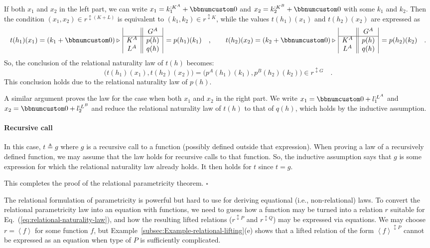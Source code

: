 If both $x_{1}$ and $x_{2}$ in the left part, we can write $x_{1}=k_{1}^{:K^{A}}+\bbnum 0$
and $x_{2}=k_{2}^{:K^{B}}+\bbnum 0$ with some $k_{1}$ and $k_{2}$.
Then the condition $(x_{1},x_{2})\in r^{\updownarrow(K+L)}$ is equivalent
to $(k_{1},k_{2})\in r^{\updownarrow K}$, while the values $t(h_{1})(x_{1})$
and $t(h_{2})(x_{2})$ are expressed as
\[
t(h_{1})(x_{1})=(k_{1}+\bbnum 0)\triangleright\,\begin{array}{|c||c|}
 & G^{A}\\
\hline K^{A} & p(h)\\
L^{A} & q(h)
\end{array}\,=p(h_{1})(k_{1})\quad,\quad\quad t(h_{2})(x_{2})=(k_{2}+\bbnum 0)\triangleright\,\begin{array}{|c||c|}
 & G^{A}\\
\hline K^{A} & p(h)\\
L^{A} & q(h)
\end{array}\,=p(h_{2})(k_{2})\quad.
\]
So, the conclusion of the relational naturality law of $t(h)$ becomes:
\[
\big(t(h_{1})(x_{1}),t(h_{2})(x_{2})\big)=\big(p^{A}(h_{1})(k_{1}),p^{B}(h_{2})(k_{2})\big)\in r^{\updownarrow G}\quad.
\]
This conclusion holds due to the relational naturality law of $p(h)$.

A similar argument proves the law for the case when both $x_{1}$
and $x_{2}$ in the right part. We write $x_{1}=\bbnum 0+l_{1}^{:L^{A}}$
and $x_{2}=\bbnum 0+l_{2}^{:L^{B}}$ and reduce the relational naturality
law of $t(h)$ to that of $q(h)$, which holds by the inductive assumption.

\paragraph{Recursive call}

In this case, $t\triangleq g$ where $g$ is a recursive call to a
function (possibly defined outside that expression). When proving
a law of a recursively defined function, we may assume that the law
holds for recursive calls to that function. So, the inductive assumption
says that $g$ is some expression for which the relational naturality
law already holds. It then holds for $t$ since $t=g$.

This completes the proof of the relational parametricity theorem.
$\square$ 

The relational formulation of parametricity is powerful but hard to
use for deriving equational (i.e., non-relational) laws. To convert
the relational parametricity law into an equation with functions,
we need to guess how a function may be turned into a relation $r$
suitable for Eq.~(\ref{eq:relational-naturality-law}), and how the
resulting lifted relations ($r^{\updownarrow P}$ and $r^{\updownarrow Q}$)
may be expressed via equations. We may choose $r=\left<f\right>$
for some function $f$, but Example~\ref{subsec:Example-relational-lifting}(e)
shows that a lifted relation of the form $\left<f\right>^{\updownarrow P}$
cannot be expressed as an equation when type of $P$ is sufficiently
complicated.

